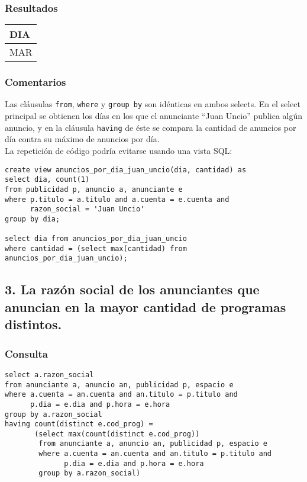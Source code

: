 \subsubsection*{Resultados}
\begin{tabular}{|l|}
  \hline
    \bf{DIA} \\ 
  \hline
    MAR \\ 
  \hline
\end{tabular} 

\subsubsection*{Comentarios}

Las cl\'ausulas \verb|from|, \verb|where| y \verb|group by| son id\'enticas en ambos selects. En el select principal se obtienen los d\'ias en los que el anunciante ``Juan Uncio'' publica alg\'un anuncio, y en la cl\'ausula \verb|having| de \'este se compara la cantidad de anuncios por d\'ia contra su m\'aximo de anuncios por d\'ia. \\

La repetici\'on de c\'odigo podr\'ia evitarse usando una vista SQL:

\begin{lstlisting}
create view anuncios_por_dia_juan_uncio(dia, cantidad) as
select dia, count(1)
from publicidad p, anuncio a, anunciante e
where p.titulo = a.titulo and a.cuenta = e.cuenta and 
      razon_social = 'Juan Uncio'
group by dia;

select dia from anuncios_por_dia_juan_uncio
where cantidad = (select max(cantidad) from anuncios_por_dia_juan_uncio);
\end{lstlisting}


\subsection*{3. \normalsize{La raz\'on social de los anunciantes que anuncian en la mayor cantidad de programas distintos.}}

\subsubsection*{Consulta}
\begin{lstlisting} 
select a.razon_social
from anunciante a, anuncio an, publicidad p, espacio e
where a.cuenta = an.cuenta and an.titulo = p.titulo and 
      p.dia = e.dia and p.hora = e.hora
group by a.razon_social
having count(distinct e.cod_prog) = 
       (select max(count(distinct e.cod_prog))
        from anunciante a, anuncio an, publicidad p, espacio e
        where a.cuenta = an.cuenta and an.titulo = p.titulo and 
              p.dia = e.dia and p.hora = e.hora
        group by a.razon_social)
\end{lstlisting}

